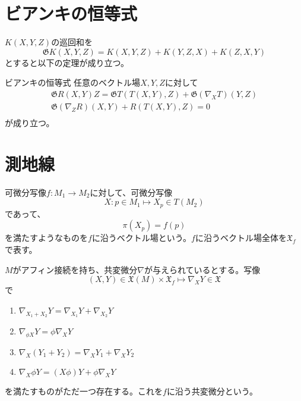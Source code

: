 \section{ビアンキの恒等式}
	$K(X, Y, Z)$の巡回和を
		\[\mathfrak{G}{K(X, Y, Z)} = K(X, Y, Z) + K(Y, Z, X) + K(Z, X, Y)\]
	とすると以下の定理が成り立つ。
	\begin{thm}{ビアンキの恒等式}
		任意のベクトル場$X, Y, Z$に対して
		\begin{gather*}
			\mathfrak{G}{R(X, Y)Z} = \mathfrak{G}{T(T(X, Y), Z)} + \mathfrak{G}{(\nabla_XT)(Y, Z)}\\
			\mathfrak{G}{(\nabla_ZR)(X, Y) + R(T(X, Y), Z)} = 0\\
		\end{gather*}
		が成り立つ。
	\end{thm}

\section{測地線}

可微分写像$f: M_1 \rightarrow M_2$に対して、可微分写像
	\[X: p \in M_1 \mapsto X_p \in T(M_2)\]
であって、
	\[\pi(X_p) = f(p)\]
を満たすようなものを$f$に沿うベクトル場という。$f$に沿うベクトル場全体を$\mathfrak{X}_f$で表す。

$M$がアフィン接続を持ち、共変微分$\nabla$が与えられているとする。写像
	\[(X, Y) \in \mathfrak{X}(M) \times \mathfrak{X}_f \mapsto \nabla_XY \in \mathfrak{X}\]
で
\begin{enumerate}
	\item $\nabla_{X_1 + X_2}Y = \nabla_{X_1}Y + \nabla_{X_2}Y$
	\item $\nabla_{\phi X}Y = \phi\nabla_XY$
	\item $\nabla_X(Y_1 + Y_2) = \nabla_XY_1 + \nabla_XY_2$
	\item $\nabla_X{\phi Y} = (X\phi)Y + \phi\nabla_XY$
\end{enumerate}
を満たすものがただ一つ存在する。これを$f$に沿う共変微分という。